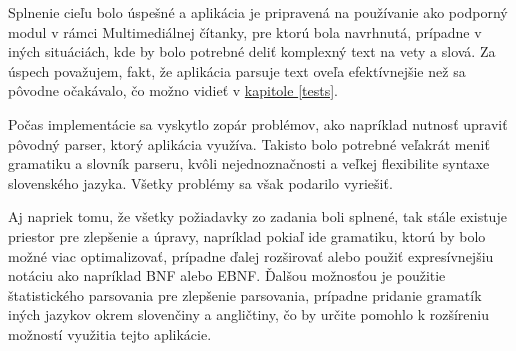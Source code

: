 \documentclass[12pt,a4paper]{report}
\theoremstyle{definition}
\theoremstyle{remark}
\begin{document}
Splnenie cieľu bolo úspešné a aplikácia je pripravená na používanie ako podporný modul v rámci Multimediálnej čítanky, pre ktorú bola navrhnutá, prípadne v iných situáciách, kde by bolo potrebné deliť komplexný text na vety a slová. Za  úspech považujem, fakt, že aplikácia parsuje text oveľa efektívnejšie než sa pôvodne očakávalo, čo možno vidieť v \hyperref[tests]{kapitole \ref{tests}}.



Počas implementácie sa vyskytlo zopár problémov, ako napríklad nutnosť upraviť pôvodný parser, ktorý aplikácia využíva. Takisto bolo potrebné veľakrát meniť gramatiku a slovník parseru, kvôli nejednoznačnosti a veľkej flexibilite syntaxe slovenského jazyka. Všetky problémy sa však podarilo vyriešiť.

Aj napriek tomu, že všetky požiadavky zo zadania boli splnené, tak stále existuje priestor pre zlepšenie a úpravy, napríklad pokiaľ ide gramatiku, ktorú by bolo možné viac optimalizovať, prípadne ďalej rozširovať alebo použiť expresívnejšiu notáciu ako napríklad BNF alebo EBNF. Ďalšou možnosťou je použitie štatistického parsovania pre zlepšenie parsovania, prípadne pridanie gramatík iných jazykov okrem slovenčiny a angličtiny, čo by určite pomohlo k rozšíreniu možností využitia tejto aplikácie. 
\end{document}
